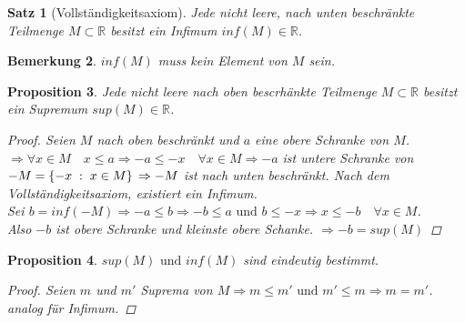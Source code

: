 \documentclass[a4paper,titlepage,oneside]{article}
\def\R{\ensuremath{\mathbb{R}} }
\def\fa{\ensuremath{\forall}}
\def\sp{\hspace{0,1cm}}
\newcommand{\menge}[2]{\ensuremath{\left\{#1\sp : \sp #2\right\}}}
\theoremstyle{thmstyle}
\theoremstyle{subthmstyle}
\newtheorem{subsatz}{Satz}[subsection]
\newtheorem{subprop}[subsatz]{Proposition}
\newtheorem{subbem}[subsatz]{Bemerkung}
\begin{document}
\begin{subsatz}[Vollständigkeitsaxiom]
Jede nicht leere, nach unten beschränkte Teilmenge \(M \subset \R\)  besitzt ein Infimum \(inf(M) \in \R\).
\end{subsatz}

\begin{subbem}
\(inf(M)\) muss kein Element von \(M\) sein.
\end{subbem}

\begin{subprop}
Jede nicht leere nach oben bescrhänkte Teilmenge \(M \subset \R\) besitzt ein Supremum \(sup(M) \in \R\).
\begin{proof}
Seien \(M\) nach oben beschränkt und \(a\) eine obere Schranke von \(M\).\\
\(\Rightarrow \fa x \in M  \quad x \le a \Rightarrow -a \le -x \quad \fa x \in M \Rightarrow -a\) ist untere Schranke von \(-M = \menge{-x}{x \in M}\\
\Rightarrow -M\) ist nach unten beschränkt. Nach dem Vollständigkeitsaxiom, existiert ein Infimum.\\
Sei \(b= inf(-M) \Rightarrow -a \le b \Rightarrow -b \le a \text{ und } b \le -x \Rightarrow x \le -b \quad \forall x \in M\).\\
Also \(-b\) ist obere Schranke und kleinste obere Schanke. \(\Rightarrow -b = sup(M)\)
\end{proof}
\end{subprop}

\begin{subprop}
\(sup(M) \text{ und } inf(M)\) sind eindeutig bestimmt.
\begin{proof}
Seien \(m\) und \(m'\) Suprema von \(M \Rightarrow m \le m' \text{ und } m' \le m \Rightarrow m = m'\).\\
analog für Infimum.
\end{proof}
\end{subprop}

\newpage
\end{document}
